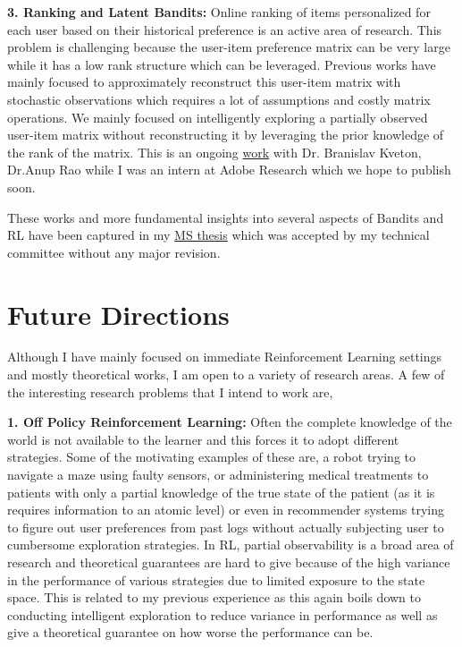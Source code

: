 \documentclass[twoside]{article}
\begin{document}

\textbf{3. Ranking and Latent Bandits:} Online ranking of items personalized for each user based on their historical preference is an active area of research. This problem is challenging because the user-item preference matrix can be very large while it has a low rank structure which can be leveraged. Previous works have mainly focused to approximately reconstruct this user-item matrix with stochastic observations which requires a lot of assumptions and costly matrix operations. We mainly focused on intelligently exploring a partially observed user-item matrix without reconstructing it by leveraging the prior knowledge of the rank of the matrix. This is an ongoing \href{https://subhojyoti.github.io/pdf/paper.pdf}{work} with Dr. Branislav Kveton, Dr.Anup Rao  while I was an intern at Adobe Research which we hope to publish soon.

These works and more fundamental insights into several aspects of Bandits and RL have been captured in my \href{https://www.cse.iitm.ac.in/~ravi/papers/Subhojyoti_thesis.pdf}{MS thesis} which was accepted by my technical committee without any major revision.
	 
	
\vspace*{-2em}
\section{Future Directions}
\vspace*{-1em}

Although I have mainly focused on immediate Reinforcement Learning settings and mostly theoretical works, I am open to a variety of research areas. A few of the interesting research problems that I intend to work are,

\textbf{1. Off Policy Reinforcement Learning:} Often the complete knowledge of the world is not available to the learner and this forces it to adopt different strategies. Some of the motivating examples of these are, a robot trying to navigate a maze using faulty sensors, or administering medical treatments to patients with only a partial knowledge of the true state of the patient (as it is requires information to an atomic level) or even in recommender systems trying to figure out user preferences from past logs without actually subjecting user to cumbersome exploration strategies. In RL,  partial observability is a broad area of research and theoretical guarantees are hard to give because of the high variance in the performance of various strategies due to limited exposure to the state space. This is related to my previous experience as this again boils down to conducting intelligent exploration to reduce variance in  performance as well as give a theoretical guarantee on how worse the performance can be.
\end{document}
